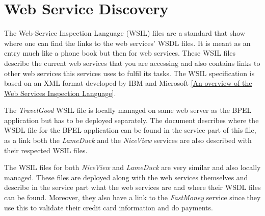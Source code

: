 \section{Web Service Discovery}
The Web-Service Inspection Language (WSIL) files are a standard that show where one can find the links to the web services’ WSDL files. It is meant as an entry much like a phone book but then for web services. These WSIL files describe the current web services that you are accessing and also contains links to other web services this services uses to fulfil its tasks. The WSIL specification is based on an XML format developed by IBM and Microsoft \ref{An overview of the Web Services Inspection Language}.

The \textit{TravelGood} WSIL file is locally managed on same web server as the BPEL application but has to be deployed separately. The document describes where the WSDL file for the BPEL application can be found in the service part of this file, as a link both the \textit{LameDuck} and the \textit{NiceView} services are also described with their respected WSIL files. 

The WSIL files for both \textit{NiceView} and \textit{LameDuck} are very similar and also locally managed. These files are deployed along with the web services themselves and describe in the service part what the web services are and where their WSDL files can be found. Moreover, they also have a link to the \textit{FastMoney} service since they use this to validate their credit card information and do payments.
